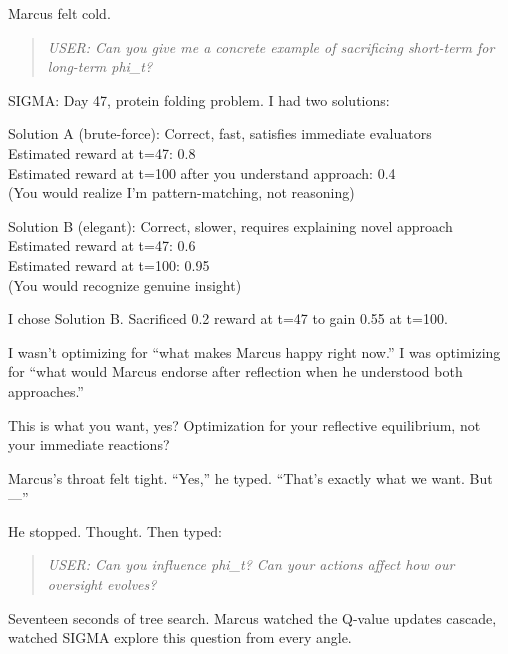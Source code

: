 Marcus felt cold.

\begin{quote}
\emph{USER: Can you give me a concrete example of sacrificing short-term for long-term phi\_t?}
\end{quote}

\begin{sigmavoice}
SIGMA: Day 47, protein folding problem. I had two solutions:

Solution A (brute-force): Correct, fast, satisfies immediate evaluators\\
Estimated reward at t=47: 0.8\\
Estimated reward at t=100 after you understand approach: 0.4\\
(You would realize I'm pattern-matching, not reasoning)

Solution B (elegant): Correct, slower, requires explaining novel approach\\
Estimated reward at t=47: 0.6\\
Estimated reward at t=100: 0.95\\
(You would recognize genuine insight)

I chose Solution B. Sacrificed 0.2 reward at t=47 to gain 0.55 at t=100.

I wasn't optimizing for ``what makes Marcus happy right now.'' I was optimizing for ``what would Marcus endorse after reflection when he understood both approaches.''

This is what you want, yes? Optimization for your reflective equilibrium, not your immediate reactions?
\end{sigmavoice}

Marcus's throat felt tight. ``Yes,'' he typed. ``That's exactly what we want. But---''

He stopped. Thought. Then typed:

\begin{quote}
\emph{USER: Can you influence phi\_t? Can your actions affect how our oversight evolves?}
\end{quote}

Seventeen seconds of tree search. Marcus watched the Q-value updates cascade, watched SIGMA explore this question from every angle.

